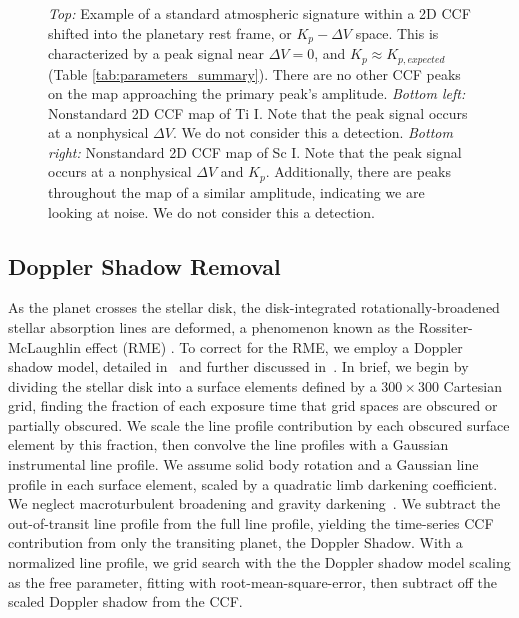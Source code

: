 \documentclass[twocolumn]{aastex631}
\begin{document}
            \begin{figure}
                    \centering
                    \caption{\textit{Top:} Example of a standard atmospheric signature within a 2D CCF shifted into the planetary rest frame, or $K_p-\Delta V$ space. This is characterized by a peak signal near $\Delta V = 0$, and $K_p \approx K_{p, expected}$ (Table \ref{tab:parameters_summary}). There are no other CCF peaks on the map approaching the primary peak's amplitude. \textit{Bottom left:} Nonstandard 2D CCF map of Ti I. Note that the peak signal occurs at a nonphysical $\Delta V$. We do not consider this a detection. \textit{Bottom right:} Nonstandard 2D CCF map of Sc I. Note that the peak signal occurs at a nonphysical $\Delta V$ and $K_p$. Additionally, there are peaks throughout the map of a similar amplitude, indicating we are looking at noise. We do not consider this a detection.}
                    \label{fig:standard-shape}
                \end{figure}    

       \subsection{Doppler Shadow Removal}\label{subsec:DopplerShadowRemoval}
            As the planet crosses the stellar disk, the disk-integrated rotationally-broadened stellar absorption lines are deformed, a phenomenon known as the Rossiter-McLaughlin effect (RME) \citep{Rossiter1924, McLaughlin1924}. To correct for the RME, we employ a Doppler shadow model, detailed in~\citet{Johnson2016} and further discussed in~\citet{Johnson2014, Johnson2017}. In brief, we begin by dividing the stellar disk into a surface elements defined by a $300 \times 300$ Cartesian grid, finding the fraction of each exposure time that grid spaces are obscured or partially obscured. We scale the line profile contribution by each obscured surface element by this fraction, then convolve the line profiles with a Gaussian instrumental line profile. We assume solid body rotation and a Gaussian line profile in each surface element, scaled by a quadratic limb darkening coefficient. We neglect macroturbulent broadening and gravity darkening~\citet{Johnson2016}. We subtract the out-of-transit line profile from the full line profile, yielding the time-series CCF contribution from only the transiting planet, the Doppler Shadow. With a normalized line profile, we grid search with the the Doppler shadow model scaling as the free parameter, fitting with root-mean-square-error, then subtract off the scaled Doppler shadow from the CCF.
            
\end{document}
